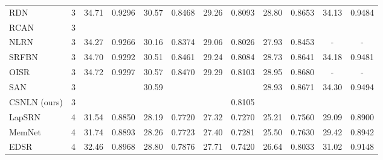 \documentclass[10pt,twocolumn,letterpaper]{article}
\begin{document}
\begin{table*}[thbp]
\begin{center}
\begin{tabular}{|l|c|c|c|c|c|c|c|c|c|c|c|}
\\
RDN~\cite{zhang2018residual} & 3 
& 34.71
 & 0.9296
  & 30.57
   & 0.8468
    & 29.26
     & 0.8093
      & 28.80
       & 0.8653
        & 34.13
         & 0.9484
         
\\
RCAN~\cite{zhang2018image}& 3 
& \color{blue}{34.74}
 &\color{blue}{0.9299}
  & \color{blue}{30.65}
   & \color{red}{0.8482}
    & \color{blue}{29.32}
     & \color{blue}{0.8111}
      & \color{blue}{29.09}
       &\color{blue}{0.8702}
        & \color{blue}{34.44}
         &\color{blue}{0.9499}
         
\\
NLRN~\cite{liu2018non}& 3 
& {34.27}
 &{0.9266}
  & {30.16}
   &{0.8374}
    & {29.06}
     & {0.8026}
      & {27.93}
       & {0.8453}
        & {-}
         & {-}
\\
SRFBN~\cite{li2019feedback}& 3 
& {34.70}
 &{0.9292}
  & {30.51}
   &{0.8461}
    & {29.24}
     & {0.8084}
      & {28.73}
       & {0.8641}
        & {34.18}
         & {0.9481}
\\
OISR~\cite{he2019ode}& 3 
& {34.72}
 &{0.9297}
  & {30.57}
   &{0.8470}
    & {29.29}
     & {0.8103}
      & {28.95}
       & {0.8680}
        & {-}
         & {-}
\\
SAN~\cite{dai2019second} & 3 
& \color{red}{34.75}
 &\color{red}{0.9300}
  & {30.59}
   &\color{blue}{0.8476}
    &\color{red}{29.33}
     & \color{red}{0.8112}
      & {28.93}
       & {0.8671}
        & {34.30}
         & {0.9494}
        
\\
CSNLN (ours) & 3
& \color{blue}{34.74}
 & \color{red}{0.9300}
  & \color{red}{30.66}
   & \color{red}{0.8482}
    & \color{red}{29.33}
     & {0.8105}
      & \color{red}{29.13}
       & \color{red}{0.8712}
        & \color{red}{34.45}
         & \color{red}{0.9502}
\\
\hline
\hline
LapSRN~\cite{lai2017deep} & 4 
& 31.54
 & 0.8850
  & 28.19
   & 0.7720
    & 27.32
     & 0.7270
      & 25.21
       & 0.7560
        & 29.09
         & 0.8900
                   
\\
MemNet~\cite{tai2017memnet} & 4 
& 31.74
 & 0.8893
  & 28.26
   & 0.7723
    & 27.40
     & 0.7281
      & 25.50
       & 0.7630
        & 29.42
         & 0.8942
                   
\\
EDSR~\cite{lim2017enhanced} & 4 
& 32.46
 & 0.8968
  & 28.80
   & 0.7876
    & 27.71
     & 0.7420
      & 26.64
       & 0.8033
        & 31.02
         & 0.9148
                   

\end{tabular}
\end{center}
\end{table*}
\end{document}
